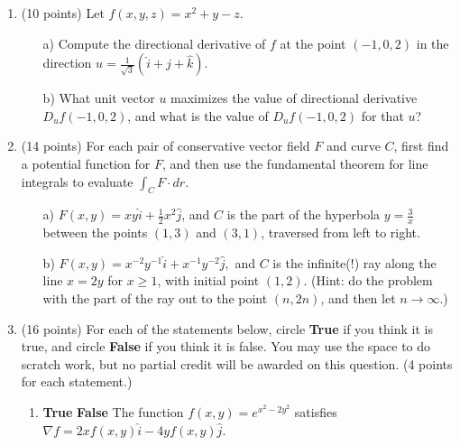 \documentclass[12 pt]{report}
\begin{document}
\newpage
\begin{enumerate}

\item (10 points) Let $f(x,y,z) = x^2 + y - z$. 

\begin{enumerate} \item[a)] Compute the directional derivative of $f$ at the point $(-1,0,2)$ in the direction $u = \frac{1}{\sqrt{3}} (\hat{i} + \hat{j} + \hat{k})$. 

\vfill 

\item[b)] What unit vector $u$ maximizes the value of directional derivative $D_u f(-1,0,2)$, and what is the value of $D_u f(-1,0,2)$ for that $u$?

\vfill

\end{enumerate}

\newpage

\item (14 points) For each pair of conservative vector field $F$ and curve $C$, first find a potential function for $F$, and then use the fundamental theorem for line integrals to evaluate $\int_C F \cdot dr$. 

\begin{enumerate} \item[a)] $F(x,y) = xy \hat{i} + \frac{1}{2}x^2 \hat{j}$, and $C$ is the part of the hyperbola $y = \frac{3}{x}$ between the points $(1,3)$ and $(3,1)$, traversed from left to right. 

\vfill

\item[b)] $F(x,y) = x^{-2} y^{-1} \hat{i} + x^{-1}y^{-2} \hat{j},$ and $C$ is the infinite(!) ray along the line $x = 2y$ for $x \geq 1$, with initial point $(1,2)$. (Hint: do the problem with the part of the ray out to the point $(n, 2n)$, and then let $n \to \infty.$)

\vfill

\end{enumerate}

\newpage


\item (16 points) For each of the statements below, circle \textbf{True} if you think it is true, and circle \textbf{False} if you think it is false. You may use the space to do scratch work, but no partial credit will be awarded on this question. (4 points for each statement.)

\begin{enumerate} 
\item \textbf{True} \hspace{5pt} \textbf{False} \hspace{10pt} The function $f(x,y) = e^{x^2-2y^2}$ satisfies $\nabla f = 2xf(x,y) \hat{i} - 4yf(x,y) \hat{j}$.


\end{enumerate}
\end{enumerate}
\end{document}
